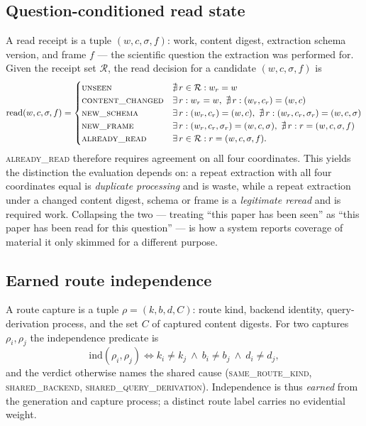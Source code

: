 \subsection{Question-conditioned read state}

A read receipt is a tuple $(w, c, \sigma, f)$: work, content digest, extraction
schema version, and frame $f$ --- the scientific question the extraction was
performed for. Given the receipt set $\mathcal{R}$, the read decision for a
candidate $(w, c, \sigma, f)$ is
\[
\mathrm{read}(w,c,\sigma,f) =
\begin{cases}
\textsc{unseen} & \nexists\, r \in \mathcal{R}: w_r = w\\
\textsc{content\_changed} & \exists\, r: w_r=w,\ \nexists\, r: (w_r,c_r)=(w,c)\\
\textsc{new\_schema} & \exists\, r: (w_r,c_r)=(w,c),\ \nexists\, r: (w_r,c_r,\sigma_r)=(w,c,\sigma)\\
\textsc{new\_frame} & \exists\, r: (w_r,c_r,\sigma_r)=(w,c,\sigma),\ \nexists\, r: r=(w,c,\sigma,f)\\
\textsc{already\_read} & \exists\, r \in \mathcal{R}: r = (w,c,\sigma,f).
\end{cases}
\]
\textsc{already\_read} therefore requires agreement on all four coordinates.
This yields the distinction the evaluation depends on: a repeat extraction with
all four coordinates equal is \emph{duplicate processing} and is waste, while a
repeat extraction under a changed content digest, schema or frame is a
\emph{legitimate reread} and is required work. Collapsing the two --- treating
``this paper has been seen'' as ``this paper has been read for this question''
--- is how a system reports coverage of material it only skimmed for a different
purpose.

\subsection{Earned route independence}

A route capture is a tuple $\rho = (k, b, d, C)$: route kind, backend identity,
query-derivation process, and the set $C$ of captured content digests. For two
captures $\rho_i, \rho_j$ the independence predicate is
\[
\mathrm{ind}(\rho_i,\rho_j) \iff k_i \neq k_j \ \wedge\ b_i \neq b_j \ \wedge\ d_i \neq d_j ,
\]
and the verdict otherwise names the shared cause
(\textsc{same\_route\_kind}, \textsc{shared\_backend},
\textsc{shared\_query\_derivation}). Independence is thus \emph{earned} from the
generation and capture process; a distinct route label carries no evidential
weight.

